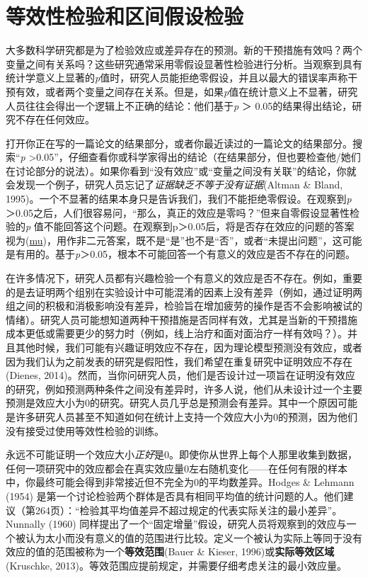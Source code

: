 \documentclass[
  letterpaper,
  DIV=11,
  numbers=noendperiod]{scrreprt}
\begin{document}

\hypertarget{sec-equivalencetest}{%
\chapter{等效性检验和区间假设检验}\label{sec-equivalencetest}}

大多数科学研究都是为了检验效应或差异存在的预测。新的干预措施有效吗？两个变量之间有关系吗？这些研究通常采用零假设显著性检验进行分析。当观察到具有统计学意义上显著的\emph{p}值时，研究人员能拒绝零假设，并且以最大的错误率声称干预有效，或者两个变量之间存在关系。但是，如果\emph{p}值在统计意义上不显著，研究人员往往会得出一个逻辑上不正确的结论：他们基于\emph{p}
＞ 0.05的结果得出结论，研究不存在任何效应。

打开你正在写的一篇论文的结果部分，或者你最近读过的一篇论文的结果部分。搜索``\emph{p}
\textgreater0.05''，仔细查看你或科学家得出的结论（在结果部分，但也要检查他/她们在讨论部分的说法）。如果你看到``没有效应''或``变量之间没有关联''的结论，你就会发现一个例子，研究人员忘记了\emph{证据缺乏不等于没有证据}(Altman
\& Bland,
1995)。一个不显著的结果本身只是告诉我们，我们不能拒绝零假设。在观察到\emph{p}
＞0.05之后，人们很容易问，``那么，真正的效应是零吗？''但来自零假设显著性检验的\emph{p}
值不能回答这个问题。在观察到p＞0.05后，将是否存在效应的问题的答案视为(\href{https://en.wikipedia.org/wiki/Mu_(negative)\#Non-dualistic_meaning}{mu})，用作非二元答案，既不是``是''也不是``否''，或者``未提出问题''，这可能是有用的。基于\emph{p}＞0.05，根本不可能回答一个有意义的效应是否不存在的问题。

在许多情况下，研究人员都有兴趣检验一个有意义的效应是否不存在。例如，重要的是去证明两个组别在实验设计中可能混淆的因素上没有差异（例如，通过证明两组之间的积极和消极影响没有差异，检验旨在增加疲劳的操作是否不会影响被试的情绪）。研究人员可能想知道两种干预措施是否同样有效，尤其是当新的干预措施成本更低或需要更少的努力时（例如，线上治疗和面对面治疗一样有效吗？）。并且其他时候，我们可能有兴趣证明效应不存在，因为理论模型预测没有效应，或者因为我们认为之前发表的研究是假阳性，我们希望在重复研究中证明效应不存在(Dienes,
2014)。然而，当你问研究人员，他们是否设计过一项旨在证明没有效应的研究，例如预测两种条件之间没有差异时，许多人说，他们从未设计过一个主要预测是效应大小为0的研究。研究人员几乎总是预测会有差异。其中一个原因可能是许多研究人员甚至不知道如何在统计上支持一个效应大小为0的预测，因为他们没有接受过使用等效性检验的训练。

永远不可能证明一个效应大小\emph{正好}是0。即使你从世界上每个人那里收集到数据，任何一项研究中的效应都会在真实效应量0左右随机变化------在任何有限的样本中，你最终可能会得到非常接近但不完全为0的平均数差异。Hodges
\& Lehmann (1954)
是第一个讨论检验两个群体是否具有相同平均值的统计问题的人。他们建议（第264页）：``检验其平均值差异不超过规定的代表实际关注的最小差异''。Nunnally
(1960)
同样提出了一个``固定增量''假设，研究人员将观察到的效应与一个被认为太小而没有意义的值的范围进行比较。定义一个被认为实际上等同于没有效应的值的范围被称为一个\textbf{等效范围}(Bauer
\& Kieser, 1996)或\textbf{实际等效区域}(Kruschke,
2013)。等效范围应提前规定，并需要仔细考虑关注的最小效应量。
\end{document}
